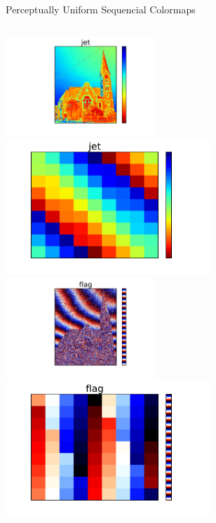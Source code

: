 \documentclass{beamer}
\newcommand{\semitransp}[2][35]{\color{fg!#1}#2}
\begin{document}
\begin{frame}
\begin{center}
\semitransp[0]{Perceptually Uniform Sequencial Colormaps}
\end{center}
\begin{columns}
\begin{column}{0.5\textwidth}
\begin{center}
\vfill
\includegraphics[width=0.42\textwidth]{../church_jet.pdf}
\includegraphics[width=0.58\textwidth]{../magicsquare_jet.pdf}\newline\newline
\vfill
\includegraphics[width=0.42\textwidth]{../church_flag.pdf}
\includegraphics[width=0.58\textwidth]{../magicsquare_flag.pdf}
\vfill
\end{center}

\end{column}
\end{columns}
\end{frame}
\end{document}
